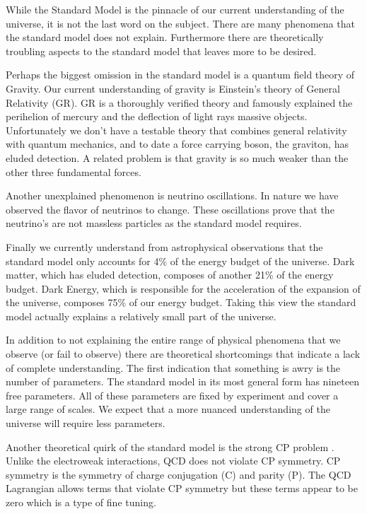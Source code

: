 
While the Standard Model is the pinnacle of our current understanding of the universe, it is not the last word on the subject.
There are many phenomena that the standard model does not explain.
Furthermore there are theoretically troubling aspects to the standard model that leaves more to be desired.

Perhaps the biggest omission in the standard model is a quantum field theory of Gravity.
Our current understanding of gravity is Einstein's theory of General Relativity (GR).
GR is a thoroughly verified theory and famously explained the perihelion of mercury and the deflection of light rays massive objects.
Unfortunately we don't have a testable theory that combines general relativity with quantum mechanics, and to date a force carrying boson, the graviton, has eluded detection.
A related problem is that gravity is so much weaker than the other three fundamental forces.

Another unexplained phenomenon is neutrino oscillations.
In nature we have observed the flavor of neutrinos to change.
These oscillations prove that the neutrino's are not massless particles as the standard model requires.

Finally we currently understand from astrophysical observations that the standard model only accounts for 4\% of the energy budget of the universe.
Dark matter, which has eluded detection, composes of another 21\% of the energy budget.
Dark Energy, which is responsible for the acceleration of the expansion of the universe, composes 75\% of our energy budget.
Taking this view the standard model actually explains a relatively small part of the universe.

In addition to not explaining the entire range of physical phenomena that we observe (or fail to observe) there are theoretical shortcomings that indicate a lack of complete understanding.
The first indication that something is awry is the number of parameters.
The standard model in its most general form has nineteen free parameters.
All of these parameters are fixed by experiment and cover a large range of scales.
We expect that a more nuanced understanding of the universe will require less parameters.

Another theoretical quirk of the standard model is the strong CP problem \cite{Dine:strongcp}.
Unlike the electroweak interactions, QCD does not violate CP symmetry.
CP symmetry is the symmetry of charge conjugation (C) and parity (P).
The QCD Lagrangian allows terms that violate CP symmetry but these terms appear to be zero which is a type of fine tuning.

